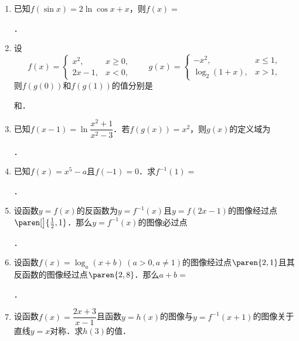 \documentclass[a4paper,punct=CCT]{ctexbook}
\theoremstyle{definition}
\theoremstyle{remark}
\newif\ifshowsol
\let\leq\leqslant
\let\le\leq
\let\geq\geqslant
\let\ge\geq}
\begin{document}
\begin{enumerate}
  \ifshowsol
  反函数为
  \[
    y =
    \begin{cases}
      -\ln\paren{x-1}, & x \ge 2, \\
      1 - \frac12 x, & 0 < x < 2, \\
      1 + \sqrt{-x}, & x \le 0.
    \end{cases}
  \]
  \fi

\item 已知\(f(\sin x) = 2 \ln \cos x + x\)，则\(f(x) =\)
  \ifshowsol
  {\setlength{\ULdepth}{.88ex}%
    \uline{\makebox[20em]{\(f(x) = \ln(1-x^2) + 2k\pi + \arcsin x,\ k \in \Z\)}}}．
  \else
  \uline{\makebox[20em]{}}．
  \fi

\item 设
  \[
    f(x) =
    \begin{cases}
      x^2, & x \ge 0, \\
      2x - 1, & x < 0,
    \end{cases}
    \qquad
    g(x) =
    \begin{cases}
      -x^2, & x \le 1, \\
      \log_2(1+x), & x > 1,
    \end{cases}
  \]
  则\(f(g(0))\)和\(f(g(1))\)的值分别是
  \ifshowsol
  \uline{\makebox[3em]{\(0\)}}和\uline{\makebox[3em]{\(-3\)}}．
  \else
  \uline{\makebox[3em]{}}和\uline{\makebox[3em]{}}．
  \fi

\item 已知\(f(x-1) = \ln \dfrac{x^2+1}{x^2-3}\)．若\(f(g(x)) = x^2\)，则\(g(x)\)的定义域为
  \ifshowsol
  \uline{\makebox[10em]{\(\paren{-\infty, 0} \cup \paren{0, +\infty}\)}}．

  实际上，\(g\)是可以求出来的，就是
  \[
    g(x) = \pm \sqrt{\frac{3e^{x^2}+1}{e^{x^2}-1}} - 1.
  \]
  \else
  \uline{\makebox[10em]{}}．
  \fi

\item 已知\(f(x) = x^5 - a\)且\(f(-1) = 0\)．求\(f^{-1}(1) =\)
  \ifshowsol
  \uline{\makebox[3em]{\(0\)}}．
  \else
  \uline{\makebox[3em]{}}．
  \fi

\item 设函数\(y = f(x)\)的反函数为\(y = f^{-1}(x)\)且\(y = f(2x-1)\)的图像经过点\(\paren[\big]{\frac12, 1}\)．那么\(y = f^{-1}(x)\)的图像必过点
  \ifshowsol
  \uline{\makebox[3em]{\(\paren{1, 0}\)}}．
  \else
  \uline{\makebox[3em]{}}．
  \fi

\item 设函数\(f(x) = \log_a(x+b)\ (a > 0, a \ne 1)\)的图像经过点\(\paren{2,1}\)且其反函数的图像经过点\(\paren{2,8}\)．那么\(a + b =\)
  \ifshowsol
  \uline{\makebox[3em]{\(4\)}}．

  实际上，\(a = 3\)且\(b = 1\)．
  \else
  \uline{\makebox[3em]{}}．
  \fi

\item 设函数\(f(x) = \dfrac{2x+3}{x-1}\)且函数\(y = h(x)\)的图像与\(y = f^{-1}(x+1)\)的图像关于直线\(y = x\)对称．求\(h(3)\)的值．

  \ifshowsol
  这题相当于是求\(3 = f^{-1}(x+1)\)时\(x\)的值．有\(f(3) = f(\,f^{-1}(x+1)) = x+1 = \dfrac92\)，所以\(h(3) = \dfrac72\)．

  实际上，\(h(x) = 1 + \dfrac{5}{x-1}\)．
  \fi

\end{enumerate}
\fi
\end{document}

